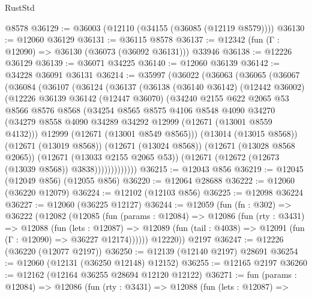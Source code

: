 \begin{lexlean}{RustStd}
\begin{coremodule}
    @8578
@36129 := @36003 (@12110 (@34155 (@36085 (@12119 @8579))))
@36130 := @12060 @36129
@36131 := @36115 @8578
@36137 := @12342 (fun (Γ : @12090) => @36130 (@36073 (@36092 @36131))) @33946
@36138 := @12226 @36129
@36139 := @36071 @34225
@36140 := @12060 @36139
@36142 := @34228 @36091 @36131
@36214 := @35997
    (@36022
      (@36063
        (@36065
          (@36067
            (@36084
              (@36107
                (@36124
                  (@36137
                    (@36138
                      (@36140 @36142)
                      (@12442 @36002)
                      (@12226
                        @36139
                        @36142
                        (@12447 @36070)
                        (@34240
                          @2155
                          @622
                          @2065
                          @53
                          @8566
                          @8576
                          @8568
                          (@34254
                            @8565
                            @8575
                            @4106
                            @8548
                            @4090
                            @34270
                            (@34279 @8558 @4090 @34289 @34292 @12999 (@12671 (@13001 @8559 @4132)))
                            @12999
                            (@12671 (@13001 @8549 @8565)))
                          (@13014 (@13015 @8568))
                          (@12671 (@13019 @8568))
                          (@12671 (@13024 @8568))
                          (@12671 (@13028 @8568 @2065))
                          (@12671 (@13033 @2155 @2065 @53))
                          (@12671 (@12672 (@12673 (@13039 @8568)) @3838)))))))))))))
@36215 := @12043 @856
@36219 := @12045 (@12049 @856) (@12055 @856)
@36220 := @12064 @28688
@36222 := @12060 (@36220 @12079)
@36224 := @12102 (@12103 @856)
@36225 := @12098 @36224
@36227 := @12060 (@36225 @12127)
@36244 := @12059
    (fun (fn : @302) =>
    @36222
      (@12082
        (@12085
          (fun (params : @12084) =>
          @12086
            (fun (rty : @3431) =>
            @12088
              (fun (lets : @12087) =>
              @12089 (fun (tail : @4038) => @12091 (fun (Γ : @12090) => @36227 @12174))))))
        @12220))
    @2197
@36247 := @12226 (@36220 (@12077 @2197))
@36250 := @12139 (@12140 @2197) @28691
@36254 := @12060 (@12131 (@36250 @12148) @12152)
@36255 := @12165 @2197
@36260 := @12162 (@12164 @36255 @28694 @12120 @12122)
@36271 := fun (params : @12084) =>
  @12086
    (fun (rty : @3431) =>
    @12088
      (fun (lets : @12087) =>

\end{coremodule}
\end{lexlean}
